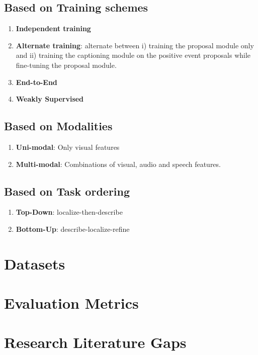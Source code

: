 \subsection{Based on Training schemes}
\begin{enumerate}
	\item \textbf{Independent training}
	\item \textbf{Alternate training}: alternate between i) training the proposal module only and ii) training the captioning module on the positive event proposals while fine-tuning the proposal module.
	\item \textbf{End-to-End}
	\item \textbf{Weakly Supervised}
\end{enumerate}

\subsection{Based on Modalities}
\begin{enumerate}
	\item \textbf{Uni-modal}: Only visual features
	\item \textbf{Multi-modal}: Combinations of visual, audio and speech features.
\end{enumerate}

\subsection{Based on Task ordering}
\begin{enumerate}
	\item \textbf{Top-Down}: localize-then-describe
	\item \textbf{Bottom-Up}: describe-localize-refine
\end{enumerate}

\section{Datasets}

\section{Evaluation Metrics}




\section{Research Literature Gaps}
